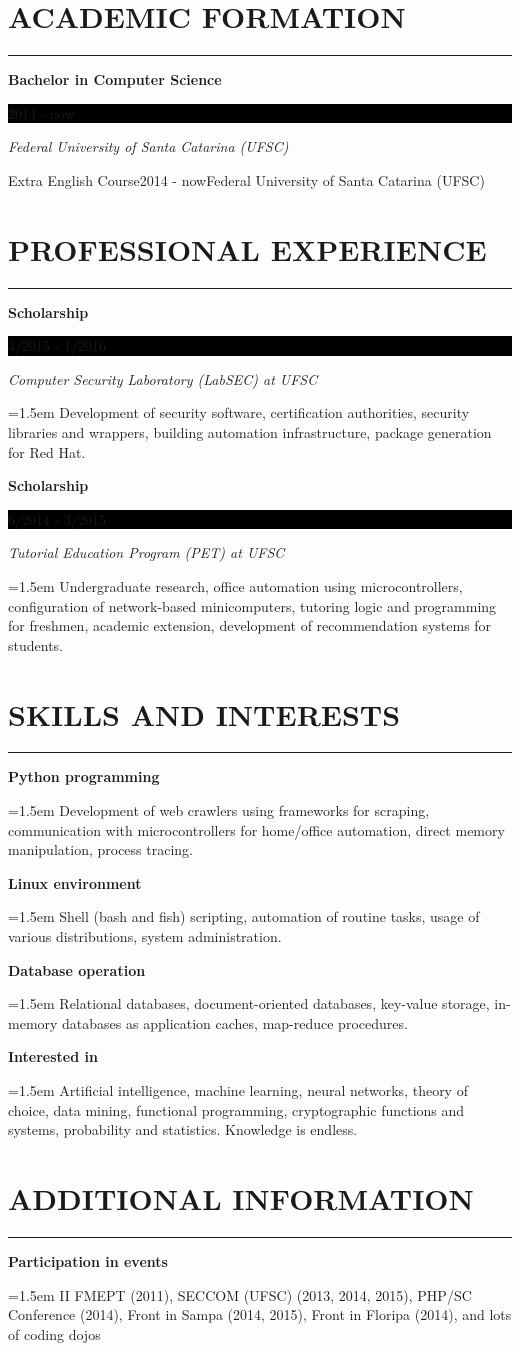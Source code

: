\documentclass{article}
\def\emcolor{blue!25!black}
\newcommand{\fgem}{\color{\emcolor}}%
\newcommand{\vsep}{\noindent\fgem\hspace{0.75em}\vrule\hspace{0.75em}\normalcolor}
\newcommand{\formationentry}[4]{%
	\noindent \textbf{#1} \hfill
	\colorbox{black}{%
		\parbox[c][1em]{8em}{%
			\hfill \color{white} #2
		}
	} \par
	\noindent \textit{#3} \par
	\normalsize
	\vspace{.8em}
}
\newcommand{\experienceentry}[4]{%
	\noindent \textbf{#1} \hfill
	\colorbox{black}{%
		\parbox[c][1em]{8em}{%
			\hfill \color{white} #2
		}
	} \par
	\noindent \textit{#3} \par
	\noindent \hangindent=1.5em \hangafter=0 \small #4 \par
	\normalsize
	\vspace{.8em}
}
\newcommand{\skillentry}[2]{%
	\noindent \textbf{#1} \hfill \par
	\noindent \hangindent=1.5em \hangafter=0 \small #2 \par
	\normalsize
	\vspace{.8em}
}
\newcommand{\additionalentry}[2]{%
	\noindent \textbf{#1} \par
	\noindent \hangindent=1.5em \hangafter=0 \small #2 \par
	\normalsize
	\vspace{.8em}
}
\newenvironment{main}{%
\noindent
\begin{minipage}[t]{\dimexpr0.75\textwidth-1.5em\relax}%
\let\oldsection\section
\renewcommand{\section}[1]{\oldsection*{\uppercase{\fgem ##1}}\vspace{-0.5em}\hrule\vspace{1em}}
}{%
\let\section\oldsection
\end{minipage}%
}
\renewcommand{\normalcolor}{\color{white!10!black}}
\begin{document}
\vsep%
\begin{main}%
\section{Academic Formation}
\formationentry{Bachelor in Computer Science}{2014 - now}{Federal University
of Santa Catarina (UFSC)}

\formationentry{Extra English Course}{2014 - now}{Federal University
of Santa Catarina (UFSC)}


\section{Professional Experience}
\experienceentry{Scholarship}{3/2015 - 1/2016}{Computer Security Laboratory
(LabSEC) at UFSC}{Development of security software, certification authorities,
security libraries and wrappers, building automation infrastructure, package
generation for Red Hat.}

\experienceentry{Scholarship}{6/2014 - 3/2015}{Tutorial Education Program (PET)
at UFSC}{Undergraduate research, office automation using microcontrollers,
configuration of network-based minicomputers, tutoring logic and programming for
freshmen, academic extension, development of recommendation systems for
students.}

\section{Skills and Interests}
\skillentry{Python programming}{Development of web crawlers using frameworks
for scraping, communication with microcontrollers for home/office automation,
direct memory manipulation, process tracing.}

\skillentry{Linux environment}{Shell (bash and fish) scripting, automation of
routine tasks, usage of various distributions, system administration.}

\skillentry{Database operation}{Relational databases, document-oriented
databases, key-value storage, in-memory databases as application caches,
map-reduce procedures.}

\skillentry{Interested in}{Artificial intelligence, machine learning, neural networks, theory of choice, data mining, functional programming, cryptographic functions and systems, probability and statistics. Knowledge is endless.}


\section{Additional Information}
\additionalentry{Participation in events}{II FMEPT (2011), SECCOM (UFSC) (2013, 2014, 2015), PHP/SC Conference (2014), Front in Sampa (2014, 2015), Front in Floripa (2014), and lots of coding dojos}


\end{main}
\end{document}
